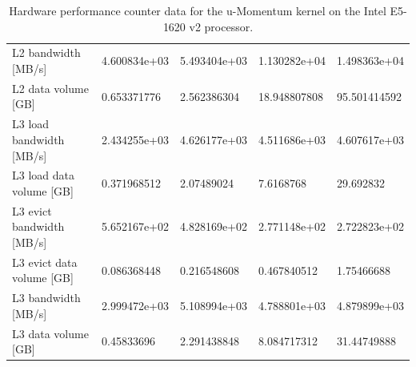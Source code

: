 \documentclass[12pt]{article}
\begin{document}
\begin{table}
\begin{tabular}{l|l|l|l|l}
L2 bandwidth [MB/s]        &  4.600834e+03 &  5.493404e+03 & 1.130282e+04 & 1.498363e+04 \\
L2 data volume [GB]        &   0.653371776 &   2.562386304 & 18.948807808 & 95.501414592 \\
\hline
L3 load bandwidth [MB/s]  &  2.434255e+03 & 4.626177e+03 & 4.511686e+03 & 4.607617e+03 \\
L3 load data volume [GB]  &   0.371968512 &  2.07489024  &   7.6168768  &   29.692832  \\
L3 evict bandwidth [MB/s] &  5.652167e+02 & 4.828169e+02 & 2.771148e+02 & 2.722823e+02 \\
L3 evict data volume [GB] &   0.086368448 &  0.216548608 &  0.467840512 &  1.75466688  \\
L3 bandwidth [MB/s]       &  2.999472e+03 & 5.108994e+03 & 4.788801e+03 & 4.879899e+03 \\
L3 data volume [GB]       &   0.45833696  &  2.291438848 &  8.084717312 &  31.44749888 \\
\hline
\hline
\end{tabular}
\caption{Hardware performance counter data for the u-Momentum kernel on the Intel E5-1620 v2 processor.}
\label{TAB_HWPC_MOM_U}
\end{table}



\end{document}
